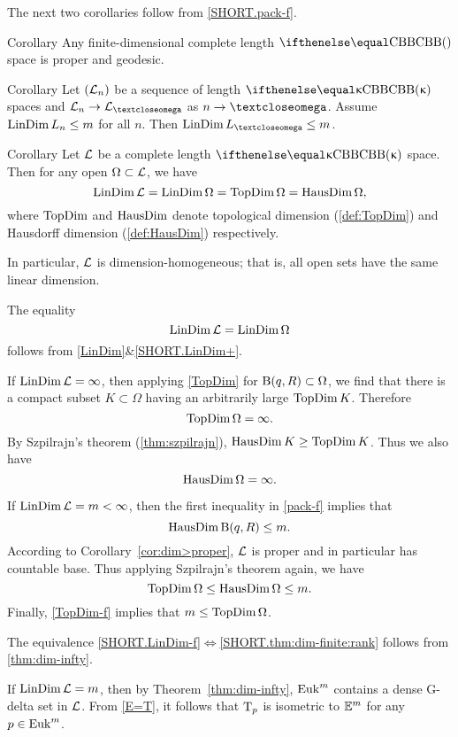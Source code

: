 The next two corollaries follow from \ref{SHORT.pack-f}.

\begin{thm}{Corollary}\label{cor:dim>proper}
Any finite-dimensional complete length $\Alex{}$ space is proper and geodesic.
\end{thm}

\begin{thm}{Corollary} Let $(\mathcal{L}_n)$ be a sequence of length $\Alex\kappa$ spaces and $\spc{L}_n\to \spc{L}_\o$ as $n\to\o$.
Assume $\LinDim L_n\le m$ for all $n$.
Then $\LinDim L_\o\le m$.
\end{thm}

\begin{thm}{Corollary}\label{dim=dim} 
Let $\mathcal{L}$ be a complete length $\Alex{\kappa}$ space. 
Then for any open $\Omega\subset \spc{L}$, we have
\[
\mathop{\rm LinDim}\nolimits \mathcal{L}=
\mathop{\rm LinDim}\nolimits\Omega =
\mathop{\rm TopDim}\nolimits\Omega=
\mathop{\rm HausDim}\nolimits\Omega,
\]
where $\mathop{\rm TopDim}\nolimits$ and $\mathop{\rm HausDim}\nolimits$ denote topological dimension (\ref{def:TopDim}) and Hausdorff dimension (\ref{def:HausDim}) respectively.

In particular, $\mathcal{L}$ is dimension-homogeneous; that is, all open sets have the same linear dimension.
\end{thm}

The equality
\[\mathop{\rm LinDim}\nolimits \mathcal{L}= \mathop{\rm LinDim}\nolimits\Omega\]
follows from \ref{LinDim}$\&$\ref{SHORT.LinDim+}.

If $\mathop{\rm LinDim}\nolimits \mathcal{L}=\infty$, then
applying \ref{TopDim} for $\oBall(q,R)\subset \Omega$, we find that there is a compact subset $K\subset \Omega$ having an arbitrarily large $\mathop{\rm TopDim}\nolimits K$. Therefore
\[\mathop{\rm TopDim}\nolimits\Omega=\infty.\] 
By Szpilrajn's theorem (\ref{thm:szpilrajn}),
$\HausDim K\ge \TopDim K$.
Thus we also have 
\[\mathop{\rm HausDim}\nolimits\Omega=\infty.\]

If $\mathop{\rm LinDim}\nolimits \mathcal{L}=m<\infty$, then the first inequality in \ref{pack-f} 
implies that \[\HausDim \oBall(q,R)\le m.\] 
According to Corollary~\ref{cor:dim>proper}, 
$\mathcal{L}$ is proper and in particular has countable base. 
Thus applying Szpilrajn's theorem again, we have
\[\TopDim\Omega\le \HausDim \Omega\le m.\]
Finally, \ref{TopDim-f} implies that $m\le\TopDim\Omega$.
\qeds

The equivalence \ref{SHORT.LinDim-f}$\Leftrightarrow$\ref{SHORT.thm:dim-finite:rank} follows from \ref{thm:dim-infty}.

If $\mathop{\rm LinDim}\nolimits\mathcal{L}=m$, then by Theorem~\ref{thm:dim-infty}, 
$\mathop{\rm Euk}\nolimits^m$ contains a dense G-delta set in $\mathcal{L}$.
From \ref{E=T}, it follows that $\text{\rm T}_p$ is isometric to $\mathbb{E}^m$ for any $p\in \Euk^m$.

